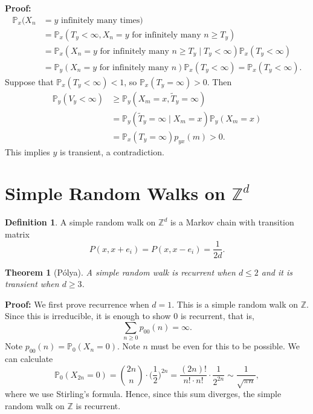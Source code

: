 \documentclass[12pt]{article}
\newtheorem{theorem}{Theorem}[section]
\theoremstyle{definition}
\newtheorem{definition}{Definition}[section]
\theoremstyle{remark}
\begin{document}
\begin{adjustbox}{minipage = \columnwidth - 25.5pt, margin=1em, frame=1pt, margin=0em}
\textbf{Proof:}
\begin{align*}
	\mathbb{P}_x(X_n &= y \text{ infinitely many times}) \\
			 &= \mathbb{P}_x(T_y < \infty, X_n = y \text{ for infinitely many } n \geq T_y) \\
							    &= \mathbb{P}_x(X_n = y \text{ for infinitely many } n \geq T_y \mid T_y < \infty) \mathbb{P}_x(T_y < \infty) \\
							    &= \mathbb{P}_y(X_n = y \text{ for infinitely many } n) \mathbb{P}_x(T_y < \infty) = \mathbb{P}_x(T_y < \infty).
\end{align*}
Suppose that $\mathbb{P}_x(T_y < \infty) < 1$, so $\mathbb{P}_x(T_y = \infty) > 0$. Then
\begin{align*}
	\mathbb{P}_y(V_y < \infty) &\geq \mathbb{P}_y(X_m = x, \tilde T_y = \infty) \\
				   &=\mathbb{P}_y(\tilde T_y = \infty \mid X_m = x) \mathbb{P}_y(X_m = x) \\
				   &= \mathbb{P}_x(T_y = \infty) p_{yx}(m) > 0.
\end{align*}
This implies $y$ is transient, a contradiction.
\end{adjustbox}

\section{Simple Random Walks on \texorpdfstring{$\mathbb{Z}^{d}$}{Z\^d}}%
\label{sec:simple_random_walks_on_zd}

\begin{definition}
	A simple random walk on $\mathbb{Z}^{d}$ is a Markov chain with transition matrix
	\[
		P(x, x+e_i) = P(x, x-e_i) = \frac{1}{2d}
	.\]
\end{definition}

\begin{theorem}[P\'{o}lya]
	A simple random walk is recurrent when $d \leq 2$ and it is transient when $d \geq 3$.
\end{theorem}

\begin{adjustbox}{minipage = \columnwidth - 25.5pt, margin=1em, frame=1pt, margin=0em}
	\textbf{Proof:} We first prove recurrence when $d = 1$. This is a simple random walk on $\mathbb{Z}$. Since this is irreducible, it is enough to show $0$ is recurrent, that is,
	\[
		\sum_{n \geq 0}p_{00}(n) = \infty
	.\]
	Note $p_{00}(n) = \mathbb{P}_0(X_n = 0)$. Note $n$ must be even for this to be possible. We can calculate
	\[
		\mathbb{P}_0(X_{2n} = 0) = \binom{2n}{n} \cdot \biggl( \frac{1}{2} \biggr)^{2n} = \frac{(2n)!}{n! \cdot n!} \cdot \frac{1}{2^{2n}} \sim \frac{1}{\sqrt{\pi n}}
	,\]
	where we use Stirling's formula. Hence, since this sum diverges, the simple random walk on $\mathbb{Z}$ is recurrent.
\end{adjustbox}
\end{document}
